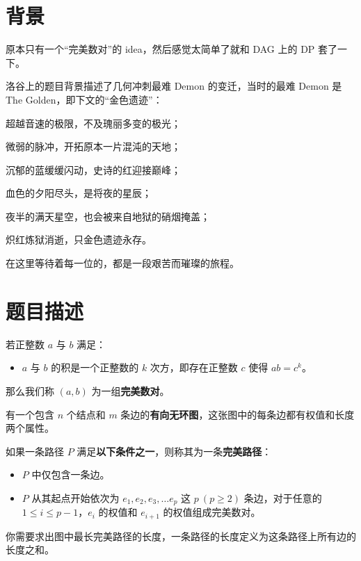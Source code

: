 \documentclass[a4paper,10pt]{article}
\begin{document}
\newpage

\section*{背景}

原本只有一个“完美数对”的 idea，然后感觉太简单了就和 DAG 上的 DP 套了一下。

洛谷上的题目背景描述了几何冲刺最难 Demon 的变迁，当时的最难 Demon 是 The Golden，即下文的“金色遗迹”：

\begin{center}
超越音速的极限，不及瑰丽多变的极光；

微弱的脉冲，开拓原本一片混沌的天地；

沉郁的蓝缓缓闪动，史诗的红迎接巅峰；

血色的夕阳尽头，是将夜的星辰；

夜半的满天星空，也会被来自地狱的硝烟掩盖；

炽红炼狱消逝，只金色遗迹永存。

在这里等待着每一位的，都是一段艰苦而璀璨的旅程。
\end{center}

\section*{题目描述}

若正整数 $a$ 与 $b$ 满足：

\begin{itemize}
\item $a$ 与 $b$ 的积是一个正整数的 $k$ 次方，即存在正整数 $c$ 使得 $ab=c^k$。
\end{itemize}

那么我们称 $(a,b)$ 为一组\textbf{完美数对}。

有一个包含 $n$ 个结点和 $m$ 条边的\textbf{有向无环图}，这张图中的每条边都有权值和长度两个属性。

如果一条路径 $P$ 满足\textbf{以下条件之一}，则称其为一条\textbf{完美路径}：

\begin{itemize}
\item $P$ 中仅包含一条边。

\item $P$ 从其起点开始依次为 $e_1, e_2, e_3, \ldots e_p$ 这 $p\ (p\ge 2)$ 条边，对于任意的 $1\leq i\leq p-1$，$e_i$ 的权值和 $e_{i+1}$ 的权值组成完美数对。
\end{itemize}

你需要求出图中最长完美路径的长度，一条路径的长度定义为这条路径上所有边的长度之和。
\end{document}
